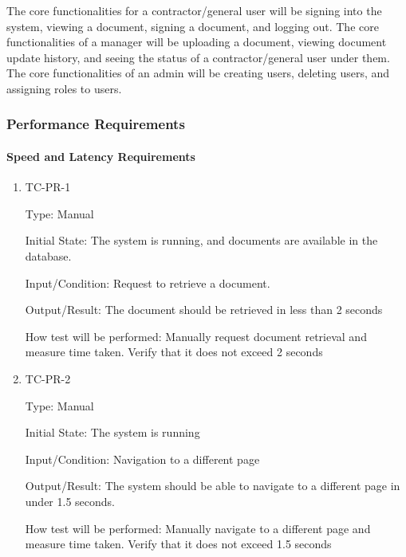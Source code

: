 \documentclass[12pt, titlepage]{article}
\begin{document}
\begin{enumerate}
    The core functionalities for a contractor/general user will be
    signing into the system, viewing a document, signing a document,
    and logging out. The core functionalities of a manager will be
    uploading a document, viewing document update history, and seeing
    the status of a contractor/general user under them. The core
    functionalities of an admin will be creating users, deleting
    users, and assigning roles to users.

\end{enumerate}

\subsubsection{Performance Requirements}

\paragraph{Speed and Latency Requirements}

\begin{enumerate}
  \item {TC-PR-1\\}

    Type: Manual
      
    Initial State: The system is running, and documents are available in the
    database.
      
    Input/Condition: Request to retrieve a document.
      
    Output/Result: The document should be retrieved in less than 2 seconds
      
    How test will be performed: Manually request document retrieval and measure
    time taken. Verify that it does not exceed 2 seconds


  \item {TC-PR-2\\}

    Type: Manual
      
    Initial State: The system is running
      
    Input/Condition: Navigation to a different page
      
    Output/Result: The system should be able to navigate to a different page
    in under 1.5 seconds.
      
    How test will be performed: Manually navigate to a different page and 
    measure time taken. Verify that it does not exceed 1.5 seconds

\end{enumerate}
\end{document}
